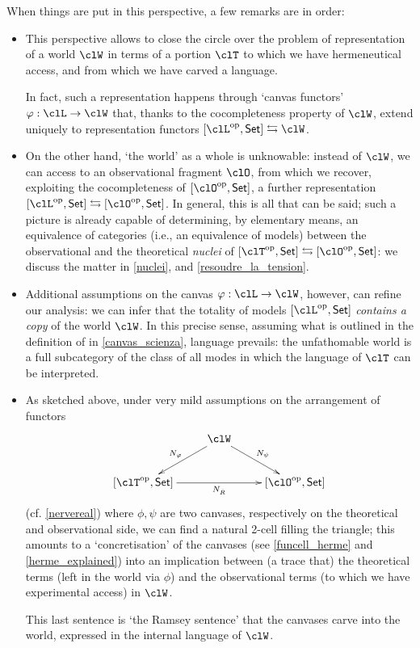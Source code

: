 When things are put in this perspective, a few remarks are in order:
\begin{itemize}
  \item This perspective allows to close the circle over the problem of representation of a world $\clW$ in terms of a portion $\clT$ to which we have hermeneutical access, and from which we have carved a language.

        In fact, such a representation happens through `canvas functors' $\phi : \clL \to \clW$ that, thanks to the cocompleteness property of $\clW$, extend uniquely to representation functors $[\clL^\op,\Set] \leftrightarrows \clW$.
  \item On the other hand, `the world' as a whole is unknowable: instead of $\clW$, we can access to an observational fragment $\clO$, from which we recover, exploiting the cocompleteness of $[\clO^\op,\Set]$, a further representation $[\clL^\op,\Set] \leftrightarrows [\clO^\op,\Set]$. In general, this is all that can be said; such a picture is already capable of determining, by elementary means, an equivalence of categories (i.e., an equivalence of models) between the observational and the theoretical \emph{nuclei} of $[\clT^\op,\Set] \leftrightarrows [\clO^\op,\Set]$: we discuss the matter in \autoref{nuclei}, and \autoref{resoudre_la_tension}.
  \item Additional assumptions on the canvas $\phi : \clL\to \clW$, however, can refine our analysis: we can infer that the totality of models $[\clL^\op,\Set]$ \emph{contains a copy} of the world $\clW$. In this precise sense, assuming what is outlined in the definition of \science in \autoref{canvas_scienza}, language prevails: the unfathomable world is a full subcategory of the class of all modes in which the language of $\clT$ can be interpreted.
  \item As sketched above, under very mild assumptions on the arrangement of functors
        \[\notag\vcenter{\xymatrix{
          & \clW \ar[dr]^{N_\psi}\ar[dl]_{N_\phi} & \\
          [\clT^\op,\Set] \ar[rr]_{N_{\hat R}} && [\clO^\op,\Set]
          }}\]
        (cf. \autoref{nervereal}) where $\phi,\psi$ are two canvases, respectively on the theoretical and observational side, we can find a natural 2-cell filling the triangle; this amounts to a `concretisation' of the canvases (see \autoref{funcell_herme} and \autoref{herme_explained}) into an implication between (a trace that) the theoretical terms (left in the world via $\phi$) and the observational terms (to which we have experimental access) in $\clW$. 
        
        This last sentence is `the Ramsey sentence' that the canvases carve into the world, expressed in the internal language of $\clW$.
\end{itemize}
